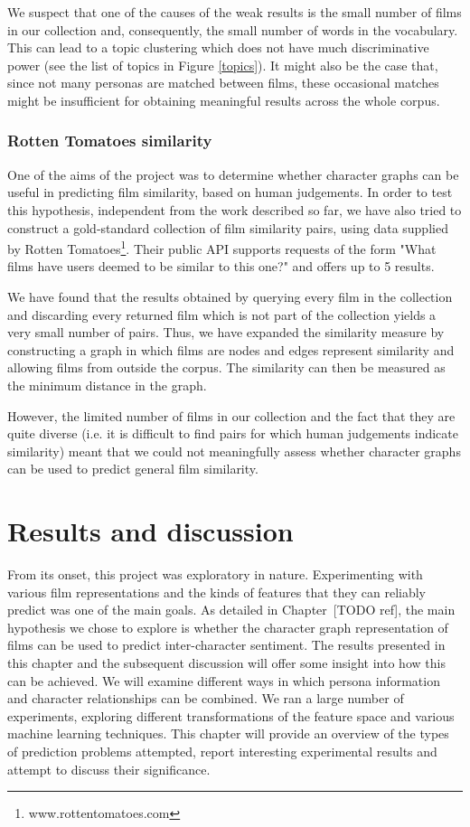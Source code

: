\documentclass[bsc,frontabs,singlespacing,parskip]{infthesis} %
\begin{document}
We suspect that one of the causes of the weak results is the small number of films in our collection and, consequently, the small number of words in the vocabulary. This can lead to a topic clustering which does not have much discriminative power (see the list of topics in Figure \ref{topics}). It might also be the case that, since not many personas are matched between films, these occasional matches might be insufficient for obtaining meaningful results across the whole corpus.

\subsection{Rotten Tomatoes similarity}
One of the aims of the project was to determine whether character graphs can be useful in predicting film similarity, based on human judgements. In order to test this hypothesis, independent from the work described so far, we have also tried to construct a gold-standard collection of film similarity pairs, using data supplied by Rotten Tomatoes\footnote{www.rottentomatoes.com}. Their public API supports requests of the form "What films have users deemed to be similar to this one?" and offers up to 5 results.

We have found that the results obtained by querying every film in the collection and discarding every returned film which is not part of the collection yields a very small number of pairs. Thus, we have expanded the similarity measure by constructing a graph in which films are nodes and edges represent similarity and allowing films from outside the corpus. The similarity can then be measured as the minimum distance in the graph.

However, the limited number of films in our collection and the fact that they are quite diverse (i.e. it is difficult to find pairs for which human judgements indicate similarity) meant that we could not meaningfully assess whether character graphs can be used to predict general film similarity. 

\chapter{Results and discussion}
\label{chap:results}

From its onset, this project was exploratory in nature. Experimenting with various film representations and the kinds of features that they can reliably predict was one of the main goals. As detailed in Chapter~[TODO ref], the main hypothesis we chose to explore is whether the character graph representation of films can be used to predict inter-character sentiment. The results presented in this chapter and the subsequent discussion will offer some insight into how this can be achieved. We will examine different ways in which persona information and character relationships can be combined. We ran a large number of experiments, exploring different transformations of the feature space and various machine learning techniques. This chapter will provide an overview of the types of prediction problems attempted, report interesting experimental results and attempt to discuss their significance.
\end{document}
